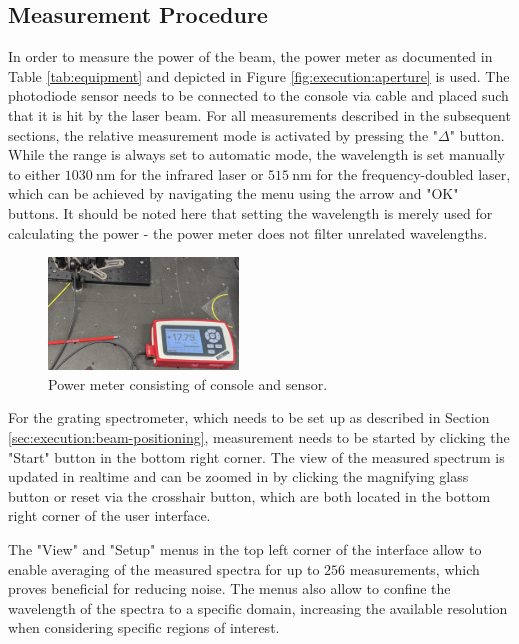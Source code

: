 \subsection{Measurement Procedure}
\label{sec:execution:measurement-procedure}

In order to measure the power of the beam, the power meter as documented in Table \ref{tab:equipment} and depicted in Figure \ref{fig:execution:aperture} is used. The photodiode sensor needs to be connected to the console via cable and placed such that it is hit by the laser beam. For all measurements described in the subsequent sections, the relative measurement mode is activated by pressing the "$\Delta$" button. While the range is always set to automatic mode, the wavelength is set manually to either $\SI{1030}{\nm}$ for the infrared laser or $\SI{515}{\nm}$ for the frequency-doubled laser, which can be achieved by navigating the menu using the arrow and "OK" buttons. It should be noted here that setting the wavelength is merely used for calculating the power - the power meter does not filter unrelated wavelengths.

\begin{figure}[H]
    \centering
    \includegraphics[width=0.45\textwidth]{graphics/power-meter.png}
    \caption{Power meter consisting of console and sensor.}
    \label{fig:execution:powermter}
\end{figure}

For the grating spectrometer, which needs to be set up as described in Section \ref{sec:execution:beam-positioning}, measurement needs to be started by clicking the "Start" button in the bottom right corner. The view of the measured spectrum is updated in realtime and can be zoomed in by clicking the magnifying glass button or reset via the crosshair button, which are both located in the bottom right corner of the user interface.

The "View" and "Setup" menus in the top left corner of the interface allow to enable averaging of the measured spectra for up to $256$ measurements, which proves beneficial for reducing noise. The menus also allow to confine the wavelength of the spectra to a specific domain, increasing the available resolution when considering specific regions of interest.


